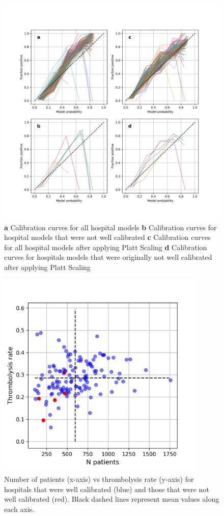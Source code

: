 \documentclass[12pt,a4paper, pdftex]{elsarticle}
\begin{document}
\begin{figure}[h]
\centering
\includegraphics[width=16cm]{figures/calibration_curves_sigmoid_train.jpg}
\caption{{\bf a} Calibration curves for all hospital models {\bf b} Calibration curves for hospital models that were not well calibrated {\bf c} Calibration curves for all hospital models after applying Platt Scaling {\bf d} Calibration curves for hospitals models that were originally not well calibrated after applying Platt Scaling}
\label{fig:calibration}
\end{figure}

\begin{figure}[h]
\centering
\includegraphics[width=10cm]{figures/uncalibrated.jpg}
\caption{Number of patients (x-axis) vs thrombolysis rate (y-axis) for hospitals that were well calibrated (blue) and those that were not well calibrated (red). Black dashed lines represent mean values along each axis.}
\label{fig:uncalibrated}
\end{figure}
\end{document}
